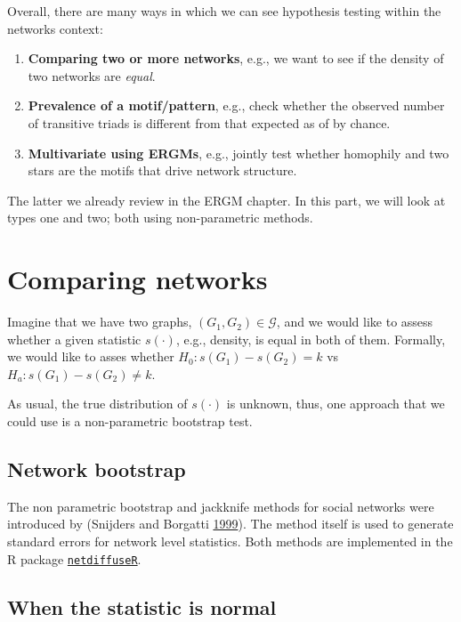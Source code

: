 \documentclass[]{book}
\begin{document}
Overall, there are many ways in which we can see hypothesis testing within
the networks context:

\begin{enumerate}
\def\labelenumi{\arabic{enumi}.}
\item
  \textbf{Comparing two or more networks}, e.g., we want to see if the density of
  two networks are \emph{equal}.
\item
  \textbf{Prevalence of a motif/pattern}, e.g., check whether the observed number
  of transitive triads is different from that expected as of by chance.
\item
  \textbf{Multivariate using ERGMs}, e.g., jointly test whether homophily and
  two stars are the motifs that drive network structure.
\end{enumerate}

The latter we already review in the ERGM chapter. In this part, we will look
at types one and two; both using non-parametric methods.

\hypertarget{comparing-networks}{%
\section{Comparing networks}\label{comparing-networks}}

Imagine that we have two graphs, \((G_1,G_2) \in \mathcal{G}\), and we would like
to assess whether a given statistic \(s(\cdot)\), e.g., density, is equal in both of them.
Formally, we would like to asses whether \(H_0: s(G_1) - s(G_2) = k\) vs
\(H_a: s(G_1) - s(G_2) \neq k\).

As usual, the true distribution of \(s(\cdot)\) is unknown, thus, one approach that
we could use is a non-parametric bootstrap test.

\hypertarget{network-bootstrap}{%
\subsection{Network bootstrap}\label{network-bootstrap}}

The non parametric bootstrap and jackknife methods for social networks were
introduced by (Snijders and Borgatti \protect\hyperlink{ref-Snijders1999}{1999}). The method itself is used to generate standard
errors for network level statistics. Both methods are implemented in the R
package \href{https://cran.r-project.org/package=netdiffuseR}{\texttt{netdiffuseR}}.

\hypertarget{when-the-statistic-is-normal}{%
\subsection{When the statistic is normal}\label{when-the-statistic-is-normal}}
\end{document}
